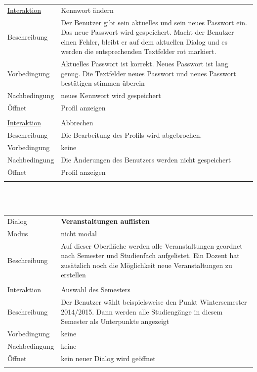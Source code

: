 \documentclass[12pt,a4paper]{article}
\begin{document}
{\begin{tabular}{l p{12cm}}
\underline{Interaktion}  	 & Kennwort ändern\\ 
Beschreibung   	 & Der Benutzer gibt sein aktuelles und sein neues Passwort ein. Das neue Passwort wird gespeichert. Macht der Benutzer einen Fehler, bleibt er auf dem aktuellen Dialog und es werden die entsprechenden Textfelder rot markiert. \\
Vorbedingung   	 & Aktuelles Passwort ist korrekt. Neues Passwort ist lang genug. Die Textfelder neues Passwort und neues Passwort bestätigen stimmen überein\\
Nachbedingung 	 & neues Kennwort wird gespeichert\\
Öffnet			 & \glqq Profil anzeigen\grqq\\\\

\underline{Interaktion} 	 & Abbrechen\\ 
Beschreibung   	 & Die Bearbeitung des Profils wird abgebrochen. \\
Vorbedingung   	 & keine\\
Nachbedingung 	 & Die Änderungen des Benutzers werden nicht gespeichert\\
Öffnet			 & \glqq Profil anzeigen\grqq\\\\
\hline
\end{tabular}\\\\  

\begin{tabular}{l p{12cm}}
Dialog 	 & \textbf{Veranstaltungen auflisten} \\ 
Modus & nicht modal\\ 
Beschreibung   	 & Auf dieser Oberfläche werden alle Veranstaltungen geordnet nach Semester und Studienfach aufgelistet. Ein Dozent hat zusätzlich noch die Möglichkeit neue Veranstaltungen zu erstellen\\\\

\underline{Interaktion} 	 & Auswahl des Semesters\\ 
Beschreibung   	 & Der Benutzer wählt beispielsweise den Punkt Wintersemester 2014/2015. Dann werden alle Studiengänge in diesem Semester als Unterpunkte angezeigt\\
Vorbedingung	& keine \\
Nachbedingung	& keine \\
Öffnet			& kein neuer Dialog wird geöffnet\\\\


\end{tabular}}
\end{document}
